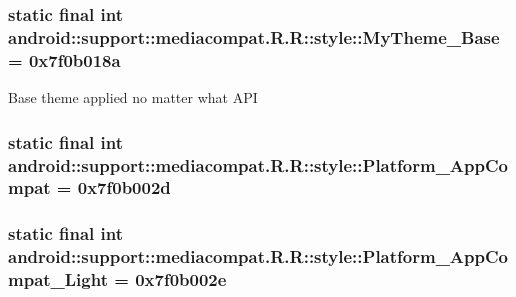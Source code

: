 \hypertarget{classandroid_1_1support_1_1mediacompat_1_1_r_1_1style_65176eb27a201a9c011ed7c95defe3b2}{
\subsubsection[{MyTheme\_\-Base}]{\setlength{\rightskip}{0pt plus 5cm}static final int android::support::mediacompat.R.R::style::MyTheme\_\-Base = 0x7f0b018a}}
\label{classandroid_1_1support_1_1mediacompat_1_1_r_1_1style_65176eb27a201a9c011ed7c95defe3b2}


Base theme applied no matter what API \hypertarget{classandroid_1_1support_1_1mediacompat_1_1_r_1_1style_a03e2a8cdb660aa1cafa7bb74e5a13c0}{
\subsubsection[{Platform\_\-AppCompat}]{\setlength{\rightskip}{0pt plus 5cm}static final int android::support::mediacompat.R.R::style::Platform\_\-AppCompat = 0x7f0b002d}}
\label{classandroid_1_1support_1_1mediacompat_1_1_r_1_1style_a03e2a8cdb660aa1cafa7bb74e5a13c0}


\hypertarget{classandroid_1_1support_1_1mediacompat_1_1_r_1_1style_44d92c859237bec2388be643ca62cf5e}{
\subsubsection[{Platform\_\-AppCompat\_\-Light}]{\setlength{\rightskip}{0pt plus 5cm}static final int android::support::mediacompat.R.R::style::Platform\_\-AppCompat\_\-Light = 0x7f0b002e}}
\label{classandroid_1_1support_1_1mediacompat_1_1_r_1_1style_44d92c859237bec2388be643ca62cf5e}


